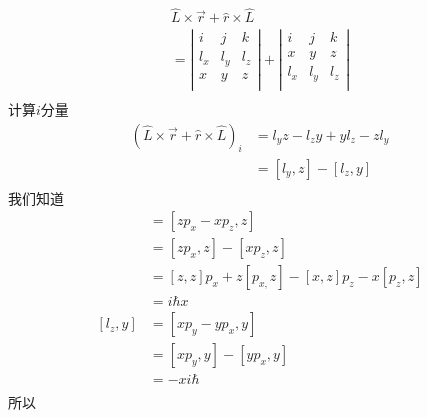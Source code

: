 $$
\begin{array}{l}
	\hat{L}\times \vec{r}+\hat{r}\times \hat{L}\\
	=\left| \begin{matrix}
	i&		j&		k\\
	l_x&		l_y&		l_z\\
	x&		y&		z\\
\end{matrix} \right|+\left| \begin{matrix}
	i&		j&		k\\
	x&		y&		z\\
	l_x&		l_y&		l_z\\
\end{matrix} \right|\\
\end{array}
$$
计算$i$分量
\begin{align}
\left(\hat{L}\times \vec{r}+\hat{r}\times \hat{L}\right)_i&= l_yz-l_zy+yl_z-zl_y\\
&=\left[ l_y,z \right] -\left[ l_z,y \right]\\
\end{align}
我们知道
\begin{align}
	[l_y,z]&=\left[ zp_x-xp_z,z \right]\\
	&=\left[ zp_x,z \right] -\left[ xp_z,z \right]\\
	&=[z,z]p_x+z\left[ p_{x,}z \right] -[x,z]p_z-x\left[ p_z,z \right]\\
	&=i\hbar x\\
	[l_z,y]&=\left[ xp_y-yp_x,y \right]\\
	&=\left[ xp_y,y \right] -[yp_x,y]\\
	&=-xi\hbar\\
\end{align}
所以
$$

$$